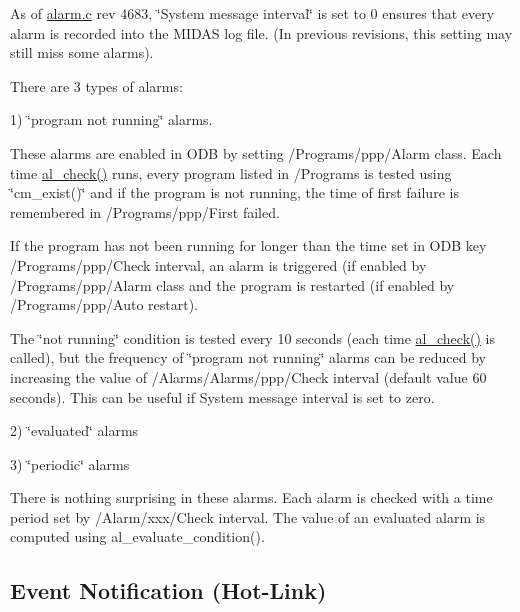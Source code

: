 As of \hyperlink{alarm_8c}{alarm.c} rev 4683,  \char`\"{}System message interval\char`\"{} is set to 0 ensures that every alarm is recorded into the MIDAS log file. (In previous revisions, this setting may still miss some alarms).

There are 3 types of alarms:

1) \char`\"{}program not running\char`\"{} alarms.

These alarms are enabled in ODB by setting /Programs/ppp/Alarm class. Each time \hyperlink{group__alfunctioncode_gaf31864a8bc5fe779057e81bde12167a9}{al\_\-check()} runs, every program listed in /Programs is tested using \char`\"{}cm\_\-exist()\char`\"{} and if the program is not running, the time of first failure is remembered in /Programs/ppp/First failed.

If the program has not been running for longer than the time set in ODB key /Programs/ppp/Check interval, an alarm is triggered (if enabled by /Programs/ppp/Alarm class and the program is restarted (if enabled by /Programs/ppp/Auto restart).

The \char`\"{}not running\char`\"{} condition is tested every 10 seconds (each time \hyperlink{group__alfunctioncode_gaf31864a8bc5fe779057e81bde12167a9}{al\_\-check()} is called), but the frequency of \char`\"{}program not running\char`\"{} alarms can be reduced by increasing the value of /Alarms/Alarms/ppp/Check interval (default value 60 seconds). This can be useful if System message interval is set to zero.

2) \char`\"{}evaluated\char`\"{} alarms

3) \char`\"{}periodic\char`\"{} alarms

There is nothing surprising in these alarms. Each alarm is checked with a time period set by /Alarm/xxx/Check interval. The value of an evaluated alarm is computed using al\_\-evaluate\_\-condition().

 \par


\label{index_end}
\hypertarget{index_end}{}
 \subsection{Event Notification (Hot-\/Link)}\label{RC_Hot_Link}
\par
 

